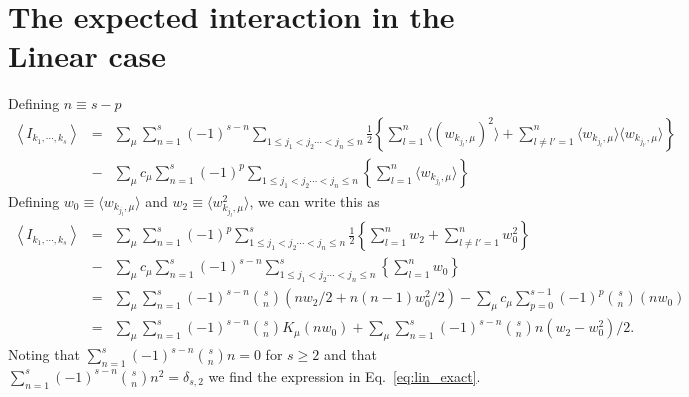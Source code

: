 \documentclass[11pt,letterpaper]{article}
\begin{document}
\section*{The expected interaction in the Linear case}
\label{appA}
Defining $n\equiv s-p$
\begin{eqnarray*}
\left \langle I_{k_1,\cdots, k_s}\right \rangle &=& \sum_{\mu} \sum^{s}_{n=1} (-1)^{s-n} \sum_{1\leq j_1<j_2\cdots < j_n\leq n} \frac{1}{2}\left\{\sum^{n}_{l=1} \langle (w_{k_{j_l},\mu})^2\rangle +\sum^{n}_{l\neq l'=1}\langle w_{k_{j_l},\mu} \rangle \langle w_{k_{j_{l'}},\mu} \rangle\right\}\\
&-& \sum_{\mu} c_{\mu}\sum^{s}_{n=1} (-1)^p \sum_{1\leq j_1<j_2\cdots < j_n\leq n} \left\{\sum^{n}_{l=1} \langle w_{k_{j_l},\mu}\rangle\right\}
\end{eqnarray*}
Defining $w_0\equiv \langle w_{k_{j_l},\mu} \rangle$ and $w_2\equiv \langle w_{k_{j_l},\mu}^2\rangle$, we can write this as 
\begin{eqnarray*}
\left \langle I_{k_1,\cdots, k_s}\right \rangle &=& \sum_{\mu} \sum^{s}_{n=1} (-1)^p \sum^{s}_{1\leq j_1<j_2\cdots < j_n\leq n} \frac{1}{2}\left\{\sum^{n}_{l=1} w_2 +\sum^{n}_{l\neq l'=1} w^2_0\right\}\\
&-& \sum_{\mu} c_{\mu}\sum^{s}_{n=1} (-1)^{s-n} \sum^s_{1\leq j_1<j_2\cdots < j_n\leq n} \left\{\sum^{n}_{l=1} w_0\right\}\\
&=&  \sum_{\mu} \sum^{s}_{n=1} (-1)^{s-n} \binom{s}{n} (nw_2/2+n(n-1)w^2_0/2) - \sum_{\mu} c_{\mu}\sum^{s-1}_{p=0} (-1)^p \binom{s}{n} (n w_0)\\
&=& \sum_{\mu} \sum^{s}_{n=1} (-1)^{s-n} \binom{s}{n} K_{\mu}(nw_0)+ \sum_{\mu} \sum^{s}_{n=1} (-1)^{s-n} \binom{s}{n} n (w_2-w^2_0)/2.
\end{eqnarray*}
Noting that $\sum^{s}_{n=1} (-1)^{s-n} \binom{s}{n} n=0$ for $s\ge2$ and that $\sum^{s}_{n=1} (-1)^{s-n} \binom{s}{n} n^2=\delta_{s,2}$ we find the expression in Eq.~\eqref{eq:lin_exact}.
\end{document}
